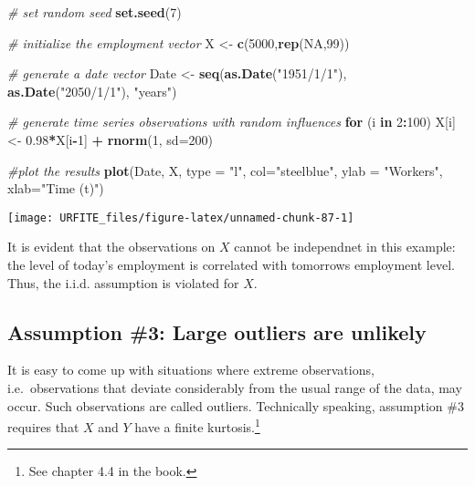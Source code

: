 \documentclass[]{book}
\newenvironment{Shaded}{\begin{snugshade}}{\end{snugshade}}
\newcommand{\KeywordTok}[1]{\textcolor[rgb]{0.13,0.29,0.53}{\textbf{#1}}}
\newcommand{\DataTypeTok}[1]{\textcolor[rgb]{0.13,0.29,0.53}{#1}}
\newcommand{\DecValTok}[1]{\textcolor[rgb]{0.00,0.00,0.81}{#1}}
\newcommand{\FloatTok}[1]{\textcolor[rgb]{0.00,0.00,0.81}{#1}}
\newcommand{\StringTok}[1]{\textcolor[rgb]{0.31,0.60,0.02}{#1}}
\newcommand{\CommentTok}[1]{\textcolor[rgb]{0.56,0.35,0.01}{\textit{#1}}}
\newcommand{\OtherTok}[1]{\textcolor[rgb]{0.56,0.35,0.01}{#1}}
\newcommand{\ControlFlowTok}[1]{\textcolor[rgb]{0.13,0.29,0.53}{\textbf{#1}}}
\newcommand{\OperatorTok}[1]{\textcolor[rgb]{0.81,0.36,0.00}{\textbf{#1}}}
\newcommand{\NormalTok}[1]{#1}
\let\rmarkdownfootnote\footnote%
\def\footnote{\protect\rmarkdownfootnote}
\theoremstyle{definition}
\theoremstyle{definition}
\theoremstyle{definition}
\theoremstyle{remark}
\begin{document}
\begin{Shaded}
\begin{Highlighting}[]
\CommentTok{# set random seed}
\KeywordTok{set.seed}\NormalTok{(}\DecValTok{7}\NormalTok{)}

\CommentTok{# initialize the employment vector}
\NormalTok{X <-}\StringTok{ }\KeywordTok{c}\NormalTok{(}\DecValTok{5000}\NormalTok{,}\KeywordTok{rep}\NormalTok{(}\OtherTok{NA}\NormalTok{,}\DecValTok{99}\NormalTok{))}

\CommentTok{# generate a date vector}
\NormalTok{Date <-}\StringTok{ }\KeywordTok{seq}\NormalTok{(}\KeywordTok{as.Date}\NormalTok{(}\StringTok{"1951/1/1"}\NormalTok{), }\KeywordTok{as.Date}\NormalTok{(}\StringTok{"2050/1/1"}\NormalTok{), }\StringTok{"years"}\NormalTok{)}

\CommentTok{# generate time series observations with random influences}
\ControlFlowTok{for}\NormalTok{ (i }\ControlFlowTok{in} \DecValTok{2}\OperatorTok{:}\DecValTok{100}\NormalTok{) X[i] <-}\StringTok{ }\FloatTok{0.98}\OperatorTok{*}\NormalTok{X[i}\OperatorTok{-}\DecValTok{1}\NormalTok{] }\OperatorTok{+}\StringTok{ }\KeywordTok{rnorm}\NormalTok{(}\DecValTok{1}\NormalTok{, }\DataTypeTok{sd=}\DecValTok{200}\NormalTok{)}

\CommentTok{#plot the results}
\KeywordTok{plot}\NormalTok{(Date, X, }\DataTypeTok{type =} \StringTok{"l"}\NormalTok{, }\DataTypeTok{col=}\StringTok{"steelblue"}\NormalTok{, }\DataTypeTok{ylab =} \StringTok{"Workers"}\NormalTok{, }\DataTypeTok{xlab=}\StringTok{"Time (t)"}\NormalTok{)}
\end{Highlighting}
\end{Shaded}

\begin{center}\texttt{[image: URFITE\_files/figure-latex/unnamed-chunk-87-1]} \end{center}

It is evident that the observations on \(X\) cannot be independnet in
this example: the level of today's employment is correlated with
tomorrows employment level. Thus, the i.i.d. assumption is violated for
\(X\).

\subsection*{Assumption \#3: Large outliers are
unlikely}\label{assumption-3-large-outliers-are-unlikely}

It is easy to come up with situations where extreme observations,
i.e.~observations that deviate considerably from the usual range of the
data, may occur. Such observations are called outliers. Technically
speaking, assumption \#3 requires that \(X\) and \(Y\) have a finite
kurtosis.\footnote{See chapter 4.4 in the book.}
\end{document}
